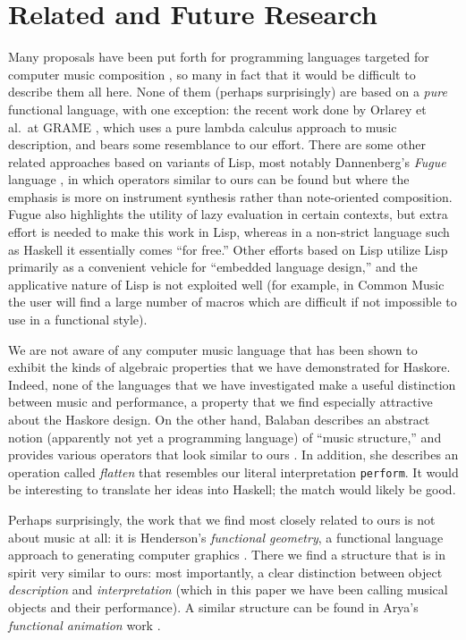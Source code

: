 \section{Related and Future Research}
\label{related}

Many proposals have been put forth for programming languages targeted
for computer music composition
\cite{canon,pla,moxie,formula,fugue,scoresynth,formes,grame94},
so many in fact that it would be difficult to describe them all here.
None of them (perhaps surprisingly) are based on a {\em pure}
functional language, with one exception: the recent work done by
Orlarey et al.\ at GRAME \cite{grame94}, which uses a pure lambda
calculus approach to music description, and bears some resemblance to
our effort.  There are some other related approaches based on variants
of Lisp, most notably Dannenberg's {\em Fugue} language \cite{fugue},
in which operators similar to ours can be found but where the emphasis
is more on instrument synthesis rather than note-oriented composition.
Fugue also highlights the utility of lazy evaluation in certain
contexts, but extra effort is needed to make this work in Lisp,
whereas in a non-strict language such as Haskell it essentially comes
``for free.''  Other efforts based on Lisp utilize Lisp primarily as a
convenient vehicle for ``embedded language design,'' and the
applicative nature of Lisp is not exploited well (for example, in
Common Music the user will find a large number of macros which are
difficult if not impossible to use in a functional style).

We are not aware of any computer music language that has been shown to
exhibit the kinds of algebraic properties that we have demonstrated
for Haskore.  Indeed, none of the languages that we have investigated
make a useful distinction between music and performance, a property
that we find especially attractive about the Haskore design.  On the
other hand, Balaban describes an abstract notion (apparently not yet a
programming language) of ``music structure,'' and provides various
operators that look similar to ours \cite{balaban92}.  In addition,
she describes an operation called {\em flatten} that resembles our
literal interpretation {\tt perform}.  It would be interesting to
translate her ideas into Haskell; the match would likely be good.

Perhaps surprisingly, the work that we find most closely related to
ours is not about music at all: it is Henderson's {\em functional
geometry}, a functional language approach to generating computer
graphics \cite{henderson82}.  There we find a structure that is in
spirit very similar to ours: most importantly, a clear distinction
between object {\em description} and {\em interpretation} (which in
this paper we have been calling musical objects and their
performance).  A similar structure can be found in Arya's {\em
functional animation} work \cite{arya94}.

